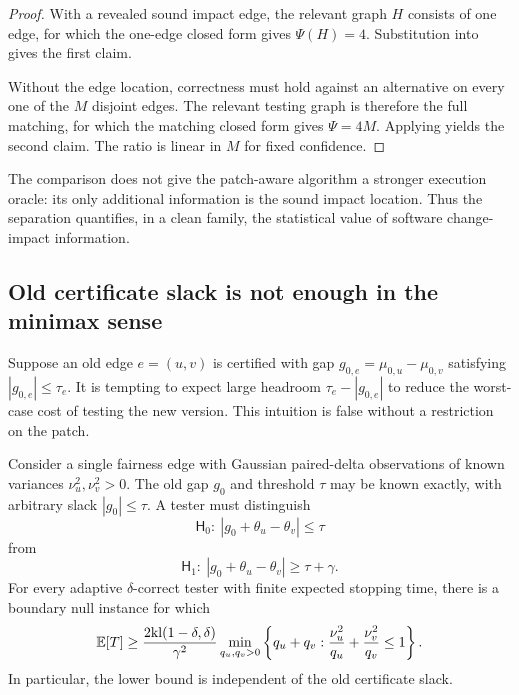\begin{proof}
With a revealed sound impact edge, the relevant graph $H$ consists of one edge,
for which the one-edge closed form gives $\Psi(H)=4$.  Substitution into
 gives the first claim.

Without the edge location, correctness must hold against an alternative on every
one of the $M$ disjoint edges.  The relevant testing graph is therefore the full
matching, for which the matching closed form gives $\Psi=4M$.  Applying
 yields the second claim.  The ratio is linear in $M$ for fixed
confidence.
\end{proof}

The comparison does not give the patch-aware algorithm a stronger execution
oracle: its only additional information is the sound impact location.  Thus the
separation quantifies, in a clean family, the statistical value of software
change-impact information.

\subsection{Old certificate slack is not enough in the minimax sense}

Suppose an old edge $e=(u,v)$ is certified with gap
$g_{0,e}=\mu_{0,u}-\mu_{0,v}$ satisfying $|g_{0,e}|\le\tau_e$.  It is tempting to
expect large headroom $\tau_e-|g_{0,e}|$ to reduce the worst-case cost of testing
the new version.  This intuition is false without a restriction on the patch.

\begin{proposition}
\label{arch:prop:slack-no-free-lunch}
Consider a single fairness edge with Gaussian paired-delta observations of known
variances $\nu_u^2,\nu_v^2>0$.  The old gap $g_0$ and threshold $\tau$ may be known
exactly, with arbitrary slack $|g_0|\le\tau$.  A tester must distinguish
\begin{equation}\label{eq:appendix-07-regression-consequences-003}
\mathsf H_0:\ |g_0+\theta_u-\theta_v|\le\tau
\end{equation}
from
\begin{equation}\label{eq:appendix-07-regression-consequences-004}
\mathsf H_1:\ |g_0+\theta_u-\theta_v|\ge\tau+\gamma.
\end{equation}
For every adaptive $\delta$-correct tester with finite expected stopping time,
there is a boundary null instance for which
\begin{equation}\label{eq:appendix-07-regression-consequences-005}
\mathbb{E}[T]\ge
\frac{2\mathrm{kl}(1-\delta,\delta)}{\gamma^2}
\min_{q_u,q_v>0}
\left\{q_u+q_v:
\frac{\nu_u^2}{q_u}+\frac{\nu_v^2}{q_v}\le1
\right\}.
\end{equation}
In particular, the lower bound is independent of the old certificate slack.
\end{proposition}

